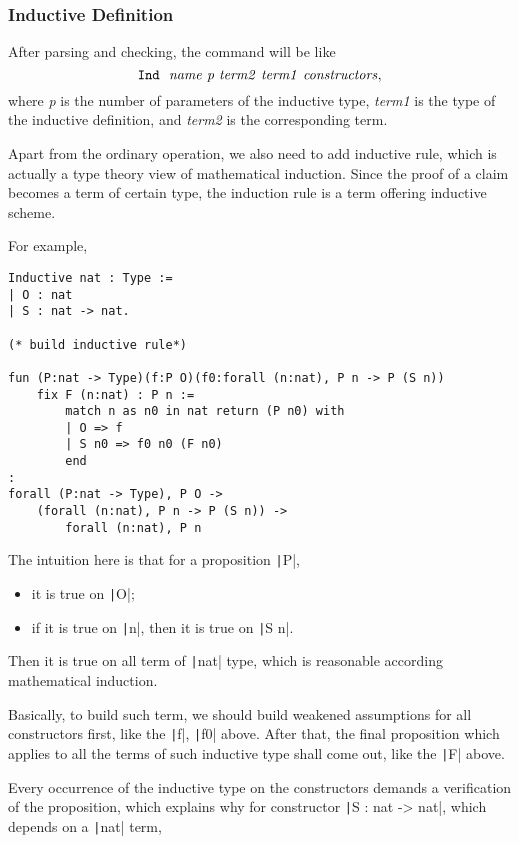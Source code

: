 \subsubsection{Inductive Definition}
After parsing and checking, the command will be like
$$
\tt Ind\ \ {\it name\ p\ term2\ term1\ constructors},
$$
where {\it p} is the number of parameters of the inductive type, {\it term1} is the type of the inductive definition,
and {\it term2} is the corresponding term.\par
Apart from the ordinary operation, we also need to add inductive rule, which is actually a type theory view of mathematical
induction. Since the proof of a claim becomes a term of certain type, the induction rule is a term offering inductive scheme.\par
For example,
\begin{center}
\begin{verbatim}
Inductive nat : Type := 
| O : nat
| S : nat -> nat.

(* build inductive rule*)

fun (P:nat -> Type)(f:P O)(f0:forall (n:nat), P n -> P (S n))
    fix F (n:nat) : P n :=
        match n as n0 in nat return (P n0) with
        | O => f
        | S n0 => f0 n0 (F n0)
        end
:
forall (P:nat -> Type), P O -> 
    (forall (n:nat), P n -> P (S n)) ->
        forall (n:nat), P n
\end{verbatim}
\end{center}
The intuition here is that for a proposition \texttt|P|,
\begin{itemize}
\item it is true on \texttt|O|;
\item if it is true on \texttt|n|, then it is true on \texttt|S n|.
\end{itemize}
Then it is true on all term of \texttt|nat| type, which is reasonable according 
mathematical induction.\par
Basically, to build such term, we should build weakened assumptions for all constructors first, 
like the \texttt|f|,
\texttt|f0| above. After that, the final proposition which applies to all the terms of such inductive type
shall come out, like the \texttt|F| above.\par
Every occurrence of the inductive type on the constructors demands a verification of the proposition,
which explains why for constructor \texttt|S : nat -> nat|, which depends on a \texttt|nat| term, 
